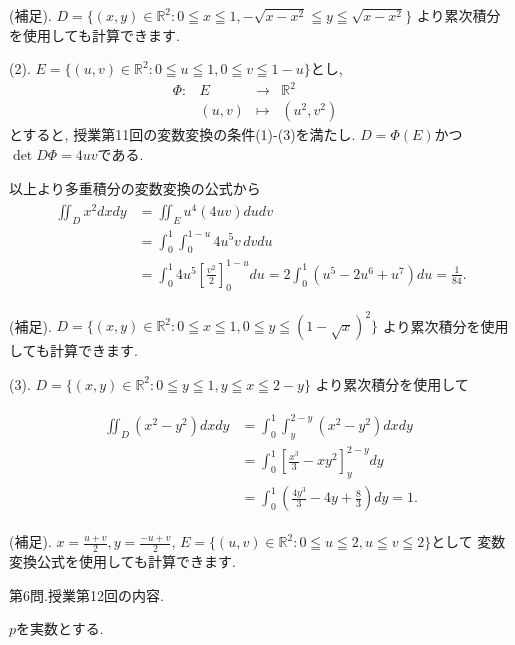 \documentclass[dvipdfmx,a4paper,11pt]{article}
\newcommand{\R}{\mathbb{R}}
\theoremstyle{definition}
\begin{document}
 
  (補足).
   $D= \{ (x,y) \in \R^2 : 0 \leqq x \leqq 1, 
 -\sqrt{x-x^2}\leqq y  \leqq \sqrt{x-x^2}\}$
 より累次積分を使用しても計算できます.
 

 (2). 
 $E= \{ (u ,v) \in \R^2 : 0 \leqq u \leqq 1,  
0 \leqq v \leqq 1-u \}$とし, 
 $$
\begin{array}{ccccc}
\Phi: &E & \rightarrow & \R^2 & \\
&(u,v) & \longmapsto & (u^2 , v^2)&
\end{array}
$$
とすると, 授業第11回の変数変換の条件(1)-(3)を満たし. $D = \Phi(E)$かつ$\det D\Phi =4uv$である.

以上より多重積分の変数変換の公式から
\begin{align*}
\begin{split}
\iint_{D} x^2 dxdy
&=
\iint_{E} u^4(4uv) dudv \\
&= \int_{0}^{1} 
 \int_{0}^{1-u} 4 u^5 v \, dvdu \\
&=
\int_{0}^{1} 4u^5
 \left[ \frac{v^2}{2} \right]_{0}^{1-u} du
=2\int_{0}^{1} \left( u^5 - 2u^6 + u^7 \right) du
=\frac{1}{84}.
    \end{split}
  \end{align*}
 
 
  (補足).
   $D= \{ (x,y) \in \R^2 : 0 \leqq x \leqq 1, 
0 \leqq y  \leqq (1-\sqrt{x})^2\}$
 より累次積分を使用しても計算できます.
 
  (3). 
   $D= \{ (x,y) \in \R^2 : 0 \leqq y \leqq 1, 
y \leqq x  \leqq 2-y \}$
より累次積分を使用して
 
\begin{align*}
\begin{split}
\iint_{D} (x^2 -y^2) dxdy
&= \int_{0}^{1} 
 \int_{y}^{2-y} (x^2 -y^2) dxdy \\
&=\int_{0}^{1} 
 \left[ \frac{x^3}{3} - x y^2 \right]_{y}^{2-y} dy\\
&=
\int_{0}^{1} 
\left( \frac{4 y^3}{3} -4y + \frac{8}{3} \right) dy
=1.
    \end{split}
  \end{align*}
 
 
  (補足).
   $x=\frac{u+v}{2}, y=\frac{-u+v}{2}$, 
 $E= \{ (u ,v) \in \R^2 : 0 \leqq u \leqq 2,  u \leqq v \leqq 2\}$として
 変数変換公式を使用しても計算できます.
 
  \vspace{33pt}
 
 {\Large 第6問.}授業第12回の内容.
\vspace{11pt}

$p$を実数とする.
\vspace{11pt}
\end{document}
